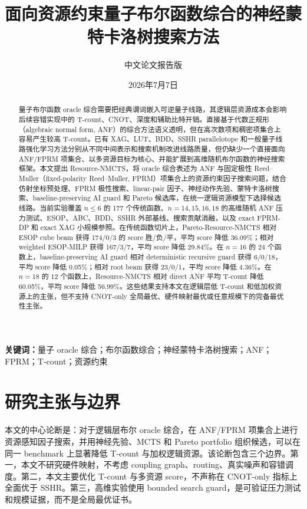 \documentclass[UTF8,fontset=macnew,11pt]{ctexart}
\title{面向资源约束量子布尔函数综合的神经蒙特卡洛树搜索方法}
\author{中文论文报告版}
\date{2026年7月7日}
\newcommand{\method}{Resource-NMCTS}
\newcommand{\pareto}{Pareto-Resource-NMCTS}
\begin{document}
\maketitle

\begin{abstract}
量子布尔函数 oracle 综合需要把经典谓词嵌入可逆量子线路，其逻辑层资源成本会影响后续容错实现中的 T-count、CNOT、深度和辅助比特开销。直接基于代数正规形（algebraic normal form, ANF）的综合方法语义透明，但在高次数项和稠密项集合上容易产生较高 T-count。已有 XAG、LUT、BDD、SSHR parallelotope 和一般量子线路强化学习方法分别从不同中间表示和搜索机制改进线路质量，但仍缺少一个直接面向 ANF/FPRM 项集合、以多资源目标为核心、并能扩展到高维随机布尔函数的神经搜索框架。本文提出 \method{}，将 oracle 综合表述为 ANF 与固定极性 Reed--Muller（fixed-polarity Reed--Muller, FPRM）项集合上的资源约束因子搜索问题，结合仿射坐标预处理、FPRM 极性搜索、linear-pair 因子、神经动作先验、蒙特卡洛树搜索、baseline-preserving AI guard 和 Pareto 候选库，在统一逻辑资源模型下选择候选线路。当前实验覆盖 $n\leq 6$ 的 177 个传统函数、$n=14,15,16,18$ 的高维随机 ANF 压力测试、ESOP、ABC、BDD、SSHR 外部基线、搜索贡献消融，以及 exact FPRM-DP 和 exact XAG 小规模参照。在传统函数切片上，\pareto{} 相对 ESOP cube beam 获得 174/0/3 的 score 胜/负/平，平均 score 降低 36.09\%；相对 weighted ESOP-MILP 获得 167/3/7，平均 score 降低 29.84\%。在 $n=16$ 的 24 个函数上，baseline-preserving AI guard 相对 deterministic recursive guard 获得 6/0/18，平均 score 降低 0.05\%；相对 root beam 获得 23/0/1，平均 score 降低 4.36\%。在 $n=18$ 的 12 个函数上，\method{} 相对 direct ANF 平均 T-count 降低 60.05\%，平均 score 降低 56.99\%。这些结果支持本文在逻辑层低 T-count 和低加权资源上的主张，但不支持 CNOT-only 全局最优、硬件映射最优或任意规模下的完备最优性主张。
\end{abstract}

\noindent\textbf{关键词：}量子 oracle 综合；布尔函数综合；神经蒙特卡洛树搜索；ANF；FPRM；T-count；资源约束

\section{研究主张与边界}

本文的中心论断是：对于逻辑层布尔 oracle 综合，在 ANF/FPRM 项集合上进行资源感知因子搜索，并用神经先验、MCTS 和 Pareto portfolio 组织候选，可以在同一 benchmark 上显著降低 T-count 与加权逻辑资源。该论断包含三个边界。第一，本文不研究硬件映射，不考虑 coupling graph、routing、真实噪声和容错调度。第二，本文主要优化 T-count 与多资源 score，不声称在 CNOT-only 指标上全面优于 SSHR。第三，高维实验使用 bounded search guard，是可验证压力测试和规模证据，而不是全局最优证书。
\end{document}
